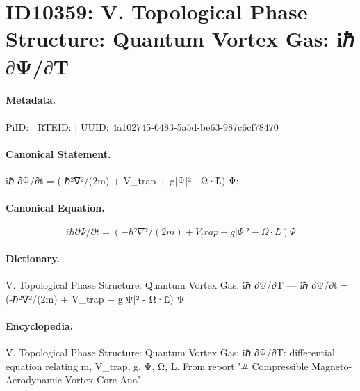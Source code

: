 \section*{ID10359: V. Topological Phase Structure: Quantum Vortex Gas: iℏ ∂Ψ/∂T}
\paragraph{Metadata.}
PiID:  | RTEID:  | UUID: 4a102745-6483-5a5d-be63-987c6cf78470

\paragraph{Canonical Statement.}
iℏ ∂Ψ/∂t = (-ℏ²∇²/(2m) + V\_trap + g|Ψ|² - Ω·L̂) Ψ;

\paragraph{Canonical Equation.}
\[
iℏ ∂Ψ/∂t = (-ℏ²∇²/(2m) + V_trap + g|Ψ|² - Ω·L̂) Ψ
\]

\paragraph{Dictionary.}
V. Topological Phase Structure: Quantum Vortex Gas: iℏ ∂Ψ/∂T — iℏ ∂Ψ/∂t = (-ℏ²∇²/(2m) + V\_trap + g|Ψ|² - Ω·L̂) Ψ

\paragraph{Encyclopedia.}
V. Topological Phase Structure: Quantum Vortex Gas: iℏ ∂Ψ/∂T: differential equation relating m, V\_trap, g, Ψ, Ω, L. From report '\# Compressible Magneto-Aerodynamic Vortex Core Ana'.
